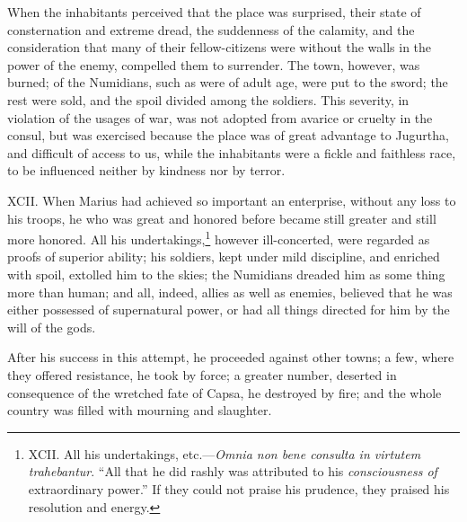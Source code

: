 When the inhabitants perceived that the place was surprised, their
state of consternation and extreme dread, the suddenness of the
calamity, and the consideration that many of their fellow-citizens
were without the walls in the power of the enemy, compelled them to
surrender. The town, however, was burned; of the Numidians, such as
were of adult age, were put to the sword; the rest were sold, and the
spoil divided among the soldiers. This severity, in violation of the
usages of war, was not adopted from avarice or cruelty in the consul,
but was exercised because the place was of great advantage to Jugurtha,
and difficult of access to us, while the inhabitants were a fickle and
faithless race, to be influenced neither by kindness nor by terror.

XCII. When Marius had achieved so important an enterprise, without any
loss to his troops, he who was great and honored before became still
greater and still more honored. All his undertakings,\footnote{XCII. All his undertakings, etc.—\emph{Omnia non bene consulta
in virtutem trahebantur}. ``All that he did rashly was attributed to
his \emph{consciousness of} extraordinary power.'' If they could not praise
his prudence, they praised his resolution and energy.} however
ill-concerted, were regarded as proofs of superior ability; his
soldiers, kept under mild discipline, and enriched with spoil,
extolled him to the skies; the Numidians dreaded him as some thing
more than human; and all, indeed, allies as well as enemies, believed
that he was either possessed of supernatural power, or had all things
directed for him by the will of the gods.

After his success in this attempt, he proceeded against other towns; a
few, where they offered resistance, he took by force; a greater number,
deserted in consequence of the wretched fate of Capsa, he destroyed by
fire; and the whole country was filled with mourning and slaughter.

